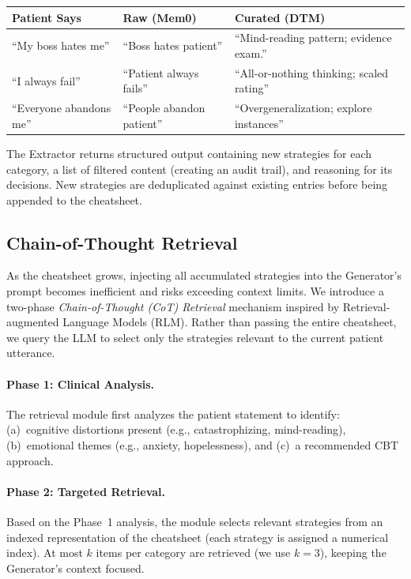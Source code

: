 \begin{center}
\small
\begin{tabular}{lll}
\toprule
\textbf{Patient Says} & \textbf{Raw (Mem0)} & \textbf{Curated (DTM)} \\
\midrule
``My boss hates me'' & ``Boss hates patient'' & ``Mind-reading pattern; evidence exam.'' \\
``I always fail'' & ``Patient always fails'' & ``All-or-nothing thinking; scaled rating'' \\
``Everyone abandons me'' & ``People abandon patient'' & ``Overgeneralization; explore instances'' \\
\bottomrule
\end{tabular}
\end{center}

The Extractor returns structured output containing new strategies for each category, a list of filtered content (creating an audit trail), and reasoning for its decisions. New strategies are deduplicated against existing entries before being appended to the cheatsheet.

\subsection{Chain-of-Thought Retrieval}
\label{sec:cot_retrieval}

As the cheatsheet grows, injecting all accumulated strategies into the Generator's prompt becomes inefficient and risks exceeding context limits. We introduce a two-phase \emph{Chain-of-Thought (CoT) Retrieval} mechanism inspired by Retrieval-augmented Language Models (RLM). Rather than passing the entire cheatsheet, we query the LLM to select only the strategies relevant to the current patient utterance.

\paragraph{Phase 1: Clinical Analysis.} The retrieval module first analyzes the patient statement to identify: (a)~cognitive distortions present (e.g., catastrophizing, mind-reading), (b)~emotional themes (e.g., anxiety, hopelessness), and (c)~a recommended CBT approach.

\paragraph{Phase 2: Targeted Retrieval.} Based on the Phase~1 analysis, the module selects relevant strategies from an indexed representation of the cheatsheet (each strategy is assigned a numerical index). At most $k$ items per category are retrieved (we use $k=3$), keeping the Generator's context focused.

